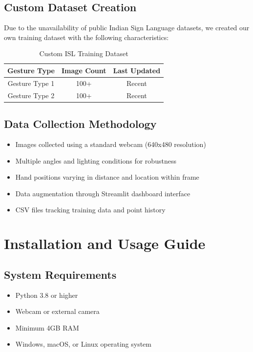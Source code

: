 \documentclass[12pt,a4paper]{report}
\begin{document}
\section{Custom Dataset Creation}

Due to the unavailability of public Indian Sign Language datasets, we created our own training dataset with the following characteristics:

\begin{table}[H]
\centering
\begin{tabular}{|c|c|c|}
\hline
\textbf{Gesture Type} & \textbf{Image Count} & \textbf{Last Updated} \\
\hline
Gesture Type 1 & 100+ & Recent \\
Gesture Type 2 & 100+ & Recent \\
\hline
\end{tabular}
\caption{Custom ISL Training Dataset}
\end{table}

\section{Data Collection Methodology}

\begin{itemize}
    \item Images collected using a standard webcam (640x480 resolution)
    \item Multiple angles and lighting conditions for robustness
    \item Hand positions varying in distance and location within frame
    \item Data augmentation through Streamlit dashboard interface
    \item CSV files tracking training data and point history
\end{itemize}

\chapter{Installation and Usage Guide}

\section{System Requirements}

\begin{itemize}
    \item Python 3.8 or higher
    \item Webcam or external camera
    \item Minimum 4GB RAM
    \item Windows, macOS, or Linux operating system
\end{itemize}
\end{document}
